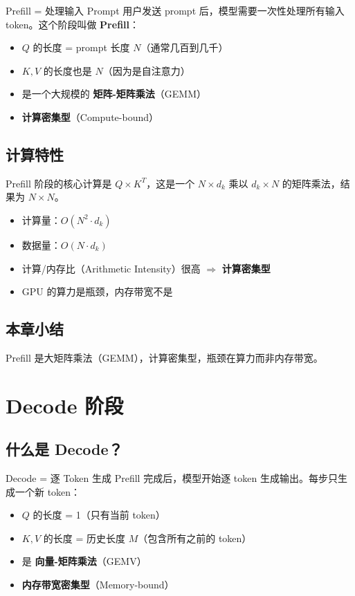 \documentclass[a4paper]{article}
\begin{document}
\begin{importantbox}{Prefill = 处理输入 Prompt}
用户发送 prompt 后，模型需要一次性处理所有输入 token。这个阶段叫做 \textbf{Prefill}：
\begin{itemize}
  \item $Q$ 的长度 = prompt 长度 $N$（通常几百到几千）
  \item $K, V$ 的长度也是 $N$（因为是自注意力）
  \item 是一个大规模的 \textbf{矩阵-矩阵乘法}（GEMM）
  \item \textbf{计算密集型}（Compute-bound）
\end{itemize}
\end{importantbox}

\subsection{计算特性}

Prefill 阶段的核心计算是 $Q \times K^T$，这是一个 $N \times d_k$ 乘以 $d_k \times N$ 的矩阵乘法，结果为 $N \times N$。

\begin{itemize}
  \item 计算量：$O(N^2 \cdot d_k)$
  \item 数据量：$O(N \cdot d_k)$
  \item 计算/内存比（Arithmetic Intensity）很高 $\Rightarrow$ \textbf{计算密集型}
  \item GPU 的算力是瓶颈，内存带宽不是
\end{itemize}

\subsection{本章小结}

Prefill 是大矩阵乘法（GEMM），计算密集型，瓶颈在算力而非内存带宽。

\section{Decode 阶段}

\subsection{什么是 Decode？}

\begin{importantbox}{Decode = 逐 Token 生成}
Prefill 完成后，模型开始逐 token 生成输出。每步只生成一个新 token：
\begin{itemize}
  \item $Q$ 的长度 = 1（只有当前 token）
  \item $K, V$ 的长度 = 历史长度 $M$（包含所有之前的 token）
  \item 是 \textbf{向量-矩阵乘法}（GEMV）
  \item \textbf{内存带宽密集型}（Memory-bound）
\end{itemize}
\end{importantbox}
\end{document}
